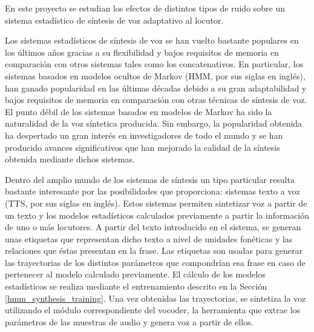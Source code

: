 \begin{resumencastellano}[english]
En este proyecto se estudian los efectos de distintos tipos de ruido sobre un sistema estad\'istico de s\'intesis de voz adaptativo al locutor.

Los sistemas estad\'isticos de s\'intesis de voz se han vuelto bastante populares en los \'ultimos a\~nos gracias a su flexibilidad y bajos requisitos de memoria en comparaci\'on con otros sistemas tales como los concatenativos.
%
En particular, los sistemas basados en modelos ocultos de Markov (HMM, por sus siglas en inglés), han ganado popularidad en las \'ultimas d\'ecadas debido a su gran adaptabilidad y bajos requisitos de memoria en comparaci\'on con otras t\'ecnicas de s\'intesis de voz.
%
El punto d\'ebil de los sistemas basados en modelos de Markov ha sido la naturalidad de la voz s\'intetica producida.
%
Sin embargo, la popularidad obtenida ha despertado un gran inter\'es en investigadores de todo el mundo y se han producido avances significativos que han mejorado la calidad de la s\'intesis obtenida mediante dichos sistemas.

Dentro del amplio mundo de los sistemas de s\'intesis un tipo particular resulta bastante interesante por las posibilidades que proporciona: sistemas texto a voz (TTS, por sus siglas en ingl\'es).
%
Estos sistemas permiten sintetizar voz a partir de un texto y los modelos estad\'isticos calculados previamente a partir la informaci\'on de uno o m\'as locutores.
%
A partir del texto introducido en el sistema, se generan unas etiquetas que representan dicho texto a nivel de unidades fon\'eticas y las relaciones que \'estas presentan en la frase.
%
Las etiquetas son usadas para generar las trayectorias de los distintos par\'ametros que compondr\'ian esa frase en caso de pertenecer al modelo calculado previamente.
%
El c\'alculo de los modelos estad\'isticos se realiza mediante el entrenamiento descrito en la Secci\'on \ref{hmm_synthesis_training}.
%
Una vez obtenidas las trayectorias, se sintetiza la voz utilizando el m\'odulo correspondiente del vocoder, la herramienta que extrae los par\'ametros de las muestras de audio y genera voz a partir de ellos.


\end{resumencastellano}
